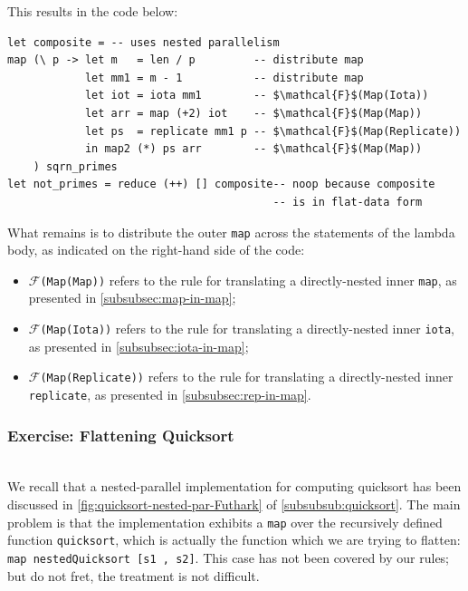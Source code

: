 \documentclass[acmsmall,review]{acmart}\settopmatter{printfolios=true,printccs=false,printacmref=false}
\begin{document}
\newpage
This results in the code below:
\begin{lstlisting}[mathescape=true]
let composite = -- uses nested parallelism
map (\ p -> let m   = len / p         -- distribute map
            let mm1 = m - 1           -- distribute map
            let iot = iota mm1        -- $\mathcal{F}$(Map(Iota))
            let arr = map (+2) iot    -- $\mathcal{F}$(Map(Map))
            let ps  = replicate mm1 p -- $\mathcal{F}$(Map(Replicate))
            in map2 (*) ps arr        -- $\mathcal{F}$(Map(Map))
    ) sqrn_primes
let not_primes = reduce (++) [] composite-- noop because composite
                                         -- is in flat-data form
\end{lstlisting}\vspace{-2ex}
What remains is to distribute the outer \lstinline{map} across
the statements of the lambda body, as indicated on the right-hand
side of the code:
\begin{itemize}
    \item {\tt $\mathcal{F}$(Map(Map))} refers to the rule for
        translating a directly-nested inner \lstinline{map},
        as presented in \cref{subsubsec:map-in-map};
    \item {\tt $\mathcal{F}$(Map(Iota))} refers to the rule for
        translating a directly-nested inner \lstinline{iota}, 
        as presented in \cref{subsubsec:iota-in-map};
    \item {\tt $\mathcal{F}$(Map(Replicate))} refers to the rule for
        translating a directly-nested inner \lstinline{replicate}, 
        as presented in \cref{subsubsec:rep-in-map}.
\end{itemize}


\subsubsection{Exercise: Flattening Quicksort}
\label{exercise:flat-quicksort}
$\mbox{ }$\\

We recall that a nested-parallel implementation for computing quicksort 
has been discussed in \cref{fig:quicksort-nested-par-Futhark}
of \cref{subsubsub:quicksort}.  The main problem is that the
implementation exhibits a \lstinline{map} over the recursively
defined function {\tt quicksort}, which is actually the function 
which we are trying to flatten: \lstinline{map nestedQuicksort [s1 , s2]}.
This case has not been covered by our rules; but do not fret,
the treatment is not difficult. 
\end{document}
